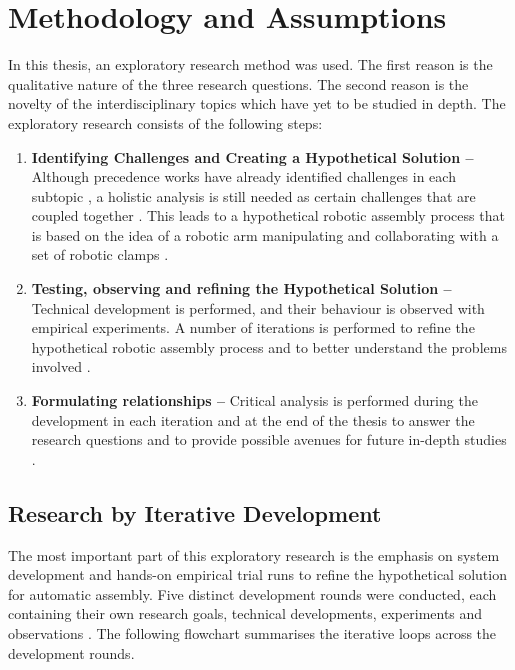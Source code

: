 \chapter{Methodology and Assumptions}
\label{chapter:methodology_and_assumptions}

In this thesis, an exploratory research method was used. The first reason is the qualitative nature of the three research questions. The second reason is the novelty of the interdisciplinary topics which have yet to be studied in depth. The exploratory research consists of the following steps:

\begin{enumerate}
	\item \textbf{Identifying Challenges and Creating a Hypothetical Solution --} Although precedence works have already identified challenges in each subtopic , a holistic analysis is still needed as certain challenges that are coupled together . This leads to a hypothetical robotic assembly process that is based on the idea of a robotic arm manipulating and collaborating with a set of robotic clamps .

	\item \textbf{Testing, observing and refining the Hypothetical Solution --} Technical development is performed, and their behaviour is observed with empirical experiments. A number of iterations is performed to refine the hypothetical robotic assembly process and to better understand the problems involved .

	\item \textbf{Formulating relationships --} Critical analysis is performed during the development in each iteration and at the end of the thesis to answer the research questions and to provide possible avenues for future in-depth studies .

\end{enumerate}
\section{Research by Iterative Development}
\label{section:methodology_research_by_iterative_development}

The most important part of this exploratory research is the emphasis on system development and hands-on empirical trial runs to refine the hypothetical solution for automatic assembly. Five distinct development rounds were conducted, each containing their own research goals, technical developments, experiments and observations . The following flowchart summarises the iterative loops across the development rounds. 

